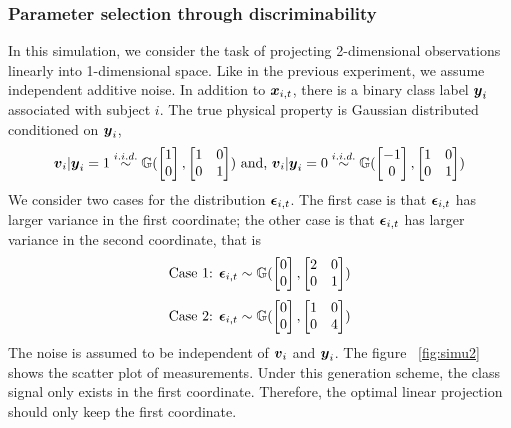 \documentclass{article}
\begin{document}
\subsubsection{Parameter selection through discriminability  }
In this simulation, we consider the task of projecting 2-dimensional observations linearly into 1-dimensional space. Like in the previous experiment, we assume independent additive noise. In addition to $\boldsymbol{x}_{i,t}$, there is a binary class label $\boldsymbol{y}_{i}$ associated with subject $i$. The true physical property is Gaussian distributed conditioned on $\boldsymbol{y}_i$,
\[\boldsymbol{v}_i|\boldsymbol{y}_i=1 \overset{i.i.d.}{\sim} \mathbb{G}(\begin{bmatrix}1\\0\end{bmatrix},\begin{bmatrix}1& 0\\0& 1\end{bmatrix}) \text{ and, } \boldsymbol{v}_i|\boldsymbol{y}_i=0 \overset{i.i.d.}{\sim} \mathbb{G}(\begin{bmatrix}-1\\0\end{bmatrix},\begin{bmatrix}1& 0\\0& 1\end{bmatrix}) \]
We consider two cases for the distribution $\boldsymbol{\epsilon}_{i,t}$. The first case is that $\boldsymbol{\epsilon}_{i,t}$ has larger variance in the first coordinate; the other case is that $\boldsymbol{\epsilon}_{i,t}$ has larger variance in the second coordinate, that is
\[ \text{Case 1: } \boldsymbol{\epsilon}_{i,t} \sim \mathbb{G}(\begin{bmatrix}0\\0\end{bmatrix},\begin{bmatrix}2& 0\\0& 1\end{bmatrix}) \]
\[ \text{Case 2: } \boldsymbol{\epsilon}_{i,t} \sim \mathbb{G}(\begin{bmatrix}0\\0\end{bmatrix},\begin{bmatrix}1& 0\\0& 4\end{bmatrix}) \]
The noise is assumed to be independent of $\boldsymbol{v}_i$ and $\boldsymbol{y}_i$. The figure ~\ref{fig:simu2} shows the scatter plot of measurements. Under this generation scheme, the class signal only exists in the first coordinate. Therefore, the optimal linear projection should only keep the first coordinate. \\
\end{document}
